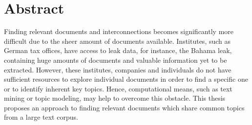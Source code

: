 \chapter*{Abstract}


Finding relevant documents and interconnections becomes significantly more difficult due to the sheer amount of documents available.
Institutes, such as German tax offices, have access to leak data, for instance, the Bahama leak, containing huge amounts of documents and valuable information yet to be extracted.
However, these institutes, companies and individuals do not have sufficient resources to explore individual documents in order to find a specific one or to identify inherent key topics.
Hence, computational means, such as text mining or topic modeling, may help to overcome this obstacle.
This thesis proposes an approach to finding relevant documents which share common topics from a large text corpus.